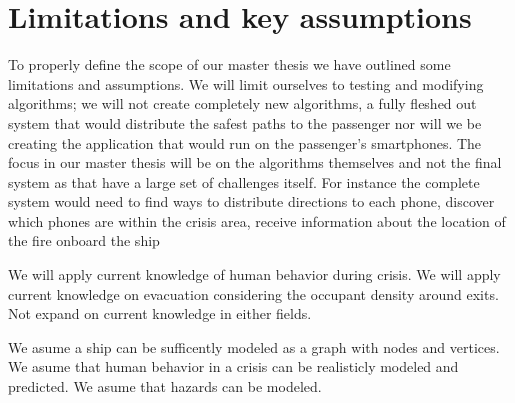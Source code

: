 \chapter{Limitations and key assumptions}
\label{ch:limitations}





To properly define the scope of our master thesis we have outlined
some limitations and assumptions. We will limit ourselves to testing and modifying algorithms;
we will not create completely new algorithms, a fully fleshed out system that would distribute the
safest paths to the passenger nor will we be creating the application that would run on the passenger's smartphones.
The focus in our master thesis will be on the algorithms themselves and not the final system as that have a large set
of challenges itself. For instance the complete system would need to find ways to distribute directions to each phone,
discover which phones are within the crisis area, receive information about the location of the fire onboard the ship

We will apply current knowledge of human behavior during crisis.
We will apply current knowledge on evacuation considering the occupant density around exits.
Not expand on current knowledge in either fields.

We asume a ship can be sufficently modeled as a graph with nodes and vertices. 
We asume that human behavior in a crisis can be realisticly modeled and
predicted. We asume that hazards can be modeled.
